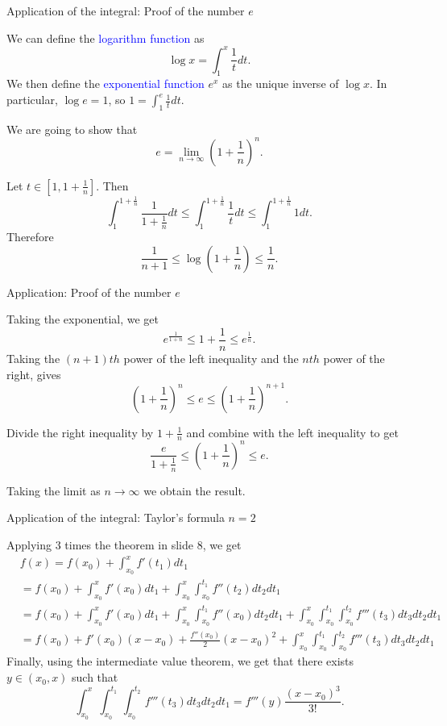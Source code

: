\documentclass[11pt,aspectratio=169]{beamer}
\begin{document}
\begin{frame}{Application of the  integral: Proof of the number $e$}

We can define the \textcolor{blue}{ logarithm function} as
$$
\log x =\int_1^x \frac{1}{t} dt.
$$
We then  define the  \textcolor{blue}{exponential function} $e^x$ as the unique inverse of $\log x$. In particular, $\log e=1$, so $1=\int_1^e \frac{1}{t} dt$.

We are  going to show that $$e=\lim_{n \rightarrow \infty} \left(1+\frac{1}{n} \right)^n.$$

Let  $t \in [1, 1+\frac1n]$. Then
$$
\int_1^{1+\frac1n} \frac{1}{1+\frac1n} dt \leq \int_1^{1+\frac1n} \frac{1}{t} dt \leq \int_1^{1+\frac1n} 1 dt.
$$
Therefore
$$
\frac{1}{n+1} \leq  \log \left(1+\frac1n \right) \leq \frac1n.
$$
\end{frame}


\begin{frame}{Application: Proof of the number $e$}

 Taking the  exponential, we get
$$
e^{\frac{1}{1+n}} \leq 1+\frac1n \leq e^{\frac1n}.
$$
Taking the  $(n+1)th$ power of the  left inequality and the  $nth$ power of the  right, gives
$$
\left(1+\frac{1}{n} \right)^n \leq e \leq \left(1+\frac{1}{n} \right)^{n+1}.
$$

 Divide the  right  inequality by  $1+\frac1n$ and combine with the left inequality  to get
$$
\frac{e}{1+\frac{1}{n} }\leq \left(1+\frac{1}{n} \right)^n \leq e.
$$

Taking the limit as $n \rightarrow \infty$ we obtain the result.
\end{frame}

\begin{frame}{Application of the  integral: Taylor's formula $n=2$}

Applying 3 times the theorem in slide 8, we get
\begin{equation*} \begin{split}
&f(x)=f(x_0)+\int_{x_0}^x f'(t_1) dt_1 \\
&=f(x_0)+\int_{x_0}^x f'(x_0) dt_1+\int_{x_0}^x \int_{x_0}^{t_1} f''(t_2) dt_2 dt_1 \\
&=f(x_0)+\int_{x_0}^x f'(x_0) dt_1+\int_{x_0}^x \int_{x_0}^{t_1} f''(x_0) dt_2 dt_1 +\int_{x_0}^x \int_{x_0}^{t_1} \int_{x_0}^{t_2} f'''(t_3) dt_3  dt_2 dt_1\\
&=f(x_0) +f'(x_0)(x-x_0)+\frac{f''(x_0)}{2}(x-x_0)^2
+\int_{x_0}^x \int_{x_0}^{t_1} \int_{x_0}^{t_2} f'''(t_3) dt_3  dt_2 dt_1
\end{split}
\end{equation*}
Finally, using the intermediate value theorem, we get that there exists $y \in (x_0, x)$ such that
$$
\int_{x_0}^x \int_{x_0}^{t_1} \int_{x_0}^{t_2} f'''(t_3) dt_3  dt_2 dt_1=f'''(y) \frac{(x-x_0)^3}{3!}.
$$\end{frame}
\end{document}
